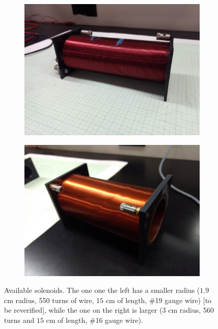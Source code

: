\documentclass[12pt]{report}
\def\anhkhoi#1{{\color{purple}[#1]}}
\begin{document}
\begin{figure}[h]
\centering
\begin{subfigure}{0.45 \textwidth}
\includegraphics[width=\textwidth]{lab3-sessiona-solenoid1}
\end{subfigure}
\begin{subfigure}{0.45 \textwidth}
\includegraphics[width=\textwidth]{lab3-sessiona-solenoid2}
\end{subfigure}
\caption{Available solenoids. The one one the left has a smaller radius ($1.9$ cm radius, 550 turns of wire, $15$ cm of length, \#19 gauge wire) \anhkhoi{to be reverified}, while the one on the right is larger ($3$ cm radius, 560 turns and $15$ cm of length, \#16 gauge wire).}
\label{Fig:lab3-sessiona-solenoids}
\end{figure}
\end{document}
